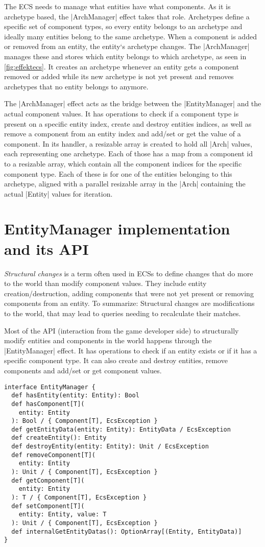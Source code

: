 The ECS needs to manage what entities have what components. As it is archetype based, the |ArchManager| effect takes that role. Archetypes define a specific set of component types, so every entity belongs to an archetype and ideally many entities belong to the same archetype. When a component is added or removed from an entity, the entity`s archetype changes. The |ArchManager| manages these and stores which entity belongs to which archetype, as seen in \cref{fig:effektecs}. It creates an archetype whenever an entity gets a component removed or added while its new archetype is not yet present and removes archetypes that no entity belongs to anymore.

The |ArchManager| effect acts as the bridge between the |EntityManager| and the actual component values. It has operations to check if a component type is present on a specific entity index, create and destroy entities indices, as well as remove a component from an entity index and add/set or get the value of a component. In its handler, a resizable array is created to hold all |Arch| values, each representing one archetype. Each of those has a map from a component id to a resizable array, which contain all the component indices for the specific component type. Each of these is for one of the entities belonging to this archetype, aligned with a parallel resizable array in the |Arch| containing the actual |Entity| values for iteration.

\section{EntityManager implementation and its API}

\textit{Structural changes} is a term often used in ECSs to define changes that do more to the world than modify component values. They include entity creation/destruction, adding components that were not yet present or removing components from an entity. To summarize: Structural changes are modifications to the world, that may lead to queries needing to recalculate their matches.

Most of the API (interaction from the game developer side) to structurally modify entities and components in the world happens through the |EntityManager| effect. It has operations to check if an entity exists or if it has a specific component type. It can also create and destroy entities, remove components and add/set or get component values.

\begin{lstlisting}[caption=EntityManager signiture]
interface EntityManager {
  def hasEntity(entity: Entity): Bool
  def hasComponent[T](
    entity: Entity
  ): Bool / { Component[T], EcsException }
  def getEntityData(entity: Entity): EntityData / EcsException
  def createEntity(): Entity
  def destroyEntity(entity: Entity): Unit / EcsException
  def removeComponent[T](
    entity: Entity
  ): Unit / { Component[T], EcsException }
  def getComponent[T](
    entity: Entity
  ): T / { Component[T], EcsException }
  def setComponent[T](
    entity: Entity, value: T
  ): Unit / { Component[T], EcsException }
  def internalGetEntityDatas(): OptionArray[(Entity, EntityData)]
}
\end{lstlisting}

